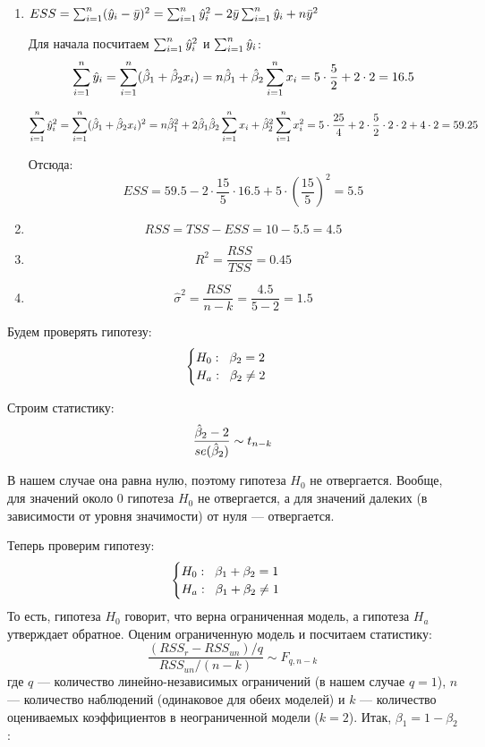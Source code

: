 \begin{problem}
\begin{sol}
\begin{enumerate}
\item $ESS = \sum_{i=1}^n(\hat{y}_i-\bar{y})^2 = \sum_{i=1}^n\hat{y}_i^2 -2\bar{y}\sum_{i=1}^n\hat{y}_i + n\bar{y}^2$

Для начала посчитаем $\sum_{i=1}^n\hat{y}_i^2$ и $\sum_{i=1}^n\hat{y}_i $:
\[
\sum_{i=1}^n\hat{y}_i = \sum_{i=1}^n(\hat{\beta}_1+\hat{\beta}_2x_i) = n\hat{\beta}_1 + \hat{\beta}_2\sum_{i=1}^nx_i = 5\cdot \frac{5}{2} + 2\cdot2 = 16.5
\]

\[
\sum_{i=1}^n\hat{y}_i^2 = \sum_{i=1}^n(\hat{\beta}_1+\hat{\beta}_2x_i)^2 = n\hat{\beta}_1^2 + 2\hat{\beta}_1\hat{\beta}_2\sum_{i=1}^nx_i + \hat{\beta}_2^2\sum_{i=1}^nx_i^2 = 5\cdot\frac{25}{4}+2\cdot\frac{5}{2}\cdot2\cdot2 + 4\cdot2= 59.25
\]

Отсюда:
\[
ESS = 59.5-2\cdot\frac{15}{5}\cdot16.5+5\cdot\left(\frac{15}{5}\right)^2 = 5.5
\]
\item \[RSS=TSS-ESS = 10-5.5 = 4.5\]
\item \[R^2 = \frac{RSS}{TSS} = 0.45\]
\item \[\hat{\sigma}^2 = \frac{RSS}{n-k} = \frac{4.5}{5-2} = 1.5\]


\end{enumerate}

Будем проверять гипотезу:
\[
\begin{cases}
H_0: \hspace{2mm} \beta_2 =2\\
H_{a}: \hspace{2mm} \beta_2 \ne2
\end{cases}
\]

Строим статистику: \[\frac{\hat{\beta}_2 - 2}{se(\hat{\beta}_2)} \sim t_{n-k}\]

В нашем случае она равна нулю, поэтому гипотеза $H_0$ не отвергается. Вообще, для значений около 0 гипотеза $H_0$ не отвергается, а для значений далеких (в зависимости от уровня значимости) от нуля — отвергается.

Теперь проверим гипотезу:
\[
\begin{cases}
H_0: \hspace{2mm} \beta_1 + \beta_2 = 1\\
H_{a}: \hspace{2mm} \beta_1 + \beta_2 \ne 1
\end{cases}
\]
То есть, гипотеза $H_0$ говорит, что верна ограниченная модель, а гипотеза $H_{a}$ утверждает обратное.
Оценим ограниченную модель и посчитаем статистику:
\[
\frac{(RSS_r-RSS_{un})/q}{RSS_{un}/(n-k)} \sim F_{q, n-k}
\]
где $q$ — количество линейно-независимых ограничений (в нашем случае $q=1$), $n$ — количество наблюдений (одинаковое для обеих моделей) и $k$ —  количество оцениваемых коэффициентов в неограниченной модели ($k=2$). Итак, $\beta_1 = 1-\beta_2$:


\end{sol}
\end{problem}
